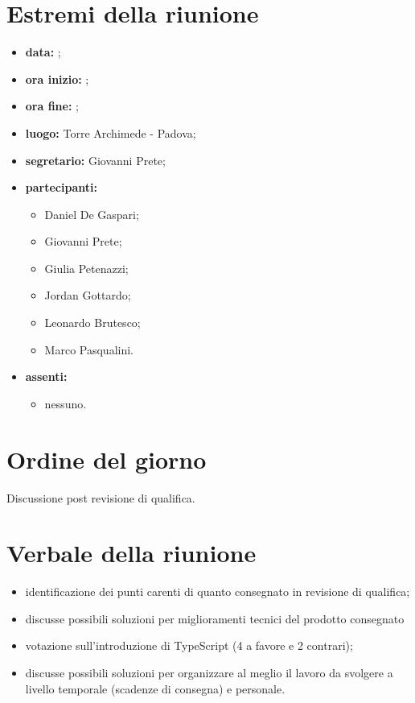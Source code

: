 \documentclass[a4paper,11pt]{article}
\begin{document}
	\section{Estremi della riunione}
	\begin{itemize}
		\item \textbf{data:} ;
		\item \textbf{ora inizio:} ;
		\item \textbf{ora fine:} ;
		\item \textbf{luogo:} Torre Archimede - Padova;
		\item \textbf{segretario:} Giovanni Prete;
		\item \textbf{partecipanti:}
			\begin{itemize}
				\item Daniel De Gaspari;
				\item Giovanni Prete;
				\item Giulia Petenazzi;
				\item Jordan Gottardo;
				\item Leonardo Brutesco;
				\item Marco Pasqualini.
			\end{itemize}
		\item \textbf{assenti:}
			\begin{itemize}
			 \item nessuno.
			\end{itemize}
	\end{itemize}
	\section{Ordine del giorno}
		Discussione post revisione di qualifica.
	\section{Verbale della riunione}
		\begin{itemize}
			\item identificazione dei punti carenti di quanto consegnato in revisione di qualifica;
			\item discusse possibili soluzioni per miglioramenti tecnici del prodotto consegnato
			\item votazione sull'introduzione di TypeScript (4 a favore e 2 contrari);
			\item discusse possibili soluzioni per organizzare al meglio  il lavoro da svolgere a livello temporale (scadenze di consegna) e personale.
		\end{itemize}
\end{document}
